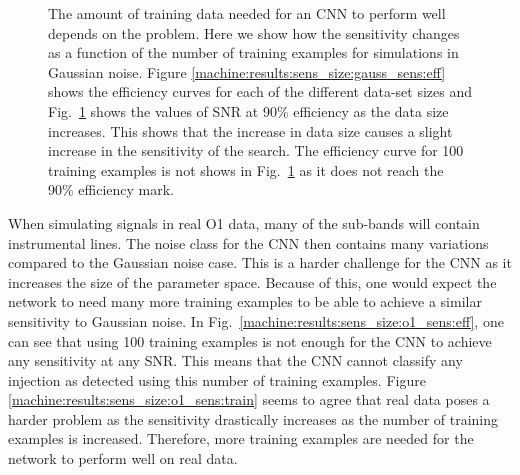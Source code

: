 \begin{figure}[h]
\begin{subfigure}[h]{0.5\textwidth}
		\caption{}
		\label{machine:results:sens_size:gauss_sens:train}
	\end{subfigure}
	\caption[Sensitivity with size of data set for Gaussian noise simulations.]{The amount of training data needed for an \gls{CNN} to perform well depends on the problem. Here we show how the sensitivity changes as a function of the number of training examples for simulations in Gaussian noise. Figure \ref{machine:results:sens_size:gauss_sens:eff} shows the efficiency curves for each of the different data-set sizes and Fig.~\ref{machine:results:sens_size:gauss_sens:train} shows the values of \gls{SNR} at 90\% efficiency as the data size increases. This shows that the increase in data size causes a slight increase in the sensitivity of the search. The efficiency curve for 100 training examples is not shows in Fig.~\ref{machine:results:sens_size:gauss_sens:train} as it does not reach the 90\% efficiency mark.}
	\label{machine:results:sens_size:gauss_sens}
\end{figure}

When simulating signals in real O1 data, many of the sub-bands will contain instrumental lines. 
The noise class for the \gls{CNN} then contains many variations compared to the Gaussian noise case. 
This is a harder challenge for the \gls{CNN} as it increases the size of the parameter space.
Because of this, one would expect the network to need many more training examples to be able to achieve a similar sensitivity to Gaussian noise.
In Fig.~\ref{machine:results:sens_size:o1_sens:eff}, one can see that using 100 training examples is not enough for the \gls{CNN} to achieve any sensitivity at any \gls{SNR}. This means that the \gls{CNN} cannot classify any injection as detected using this number of training examples.
Figure \ref{machine:results:sens_size:o1_sens:train} seems to agree that real data poses a harder problem as the sensitivity drastically increases as the number of training examples is increased.
Therefore, more training examples are needed for the network to perform well on real data.

